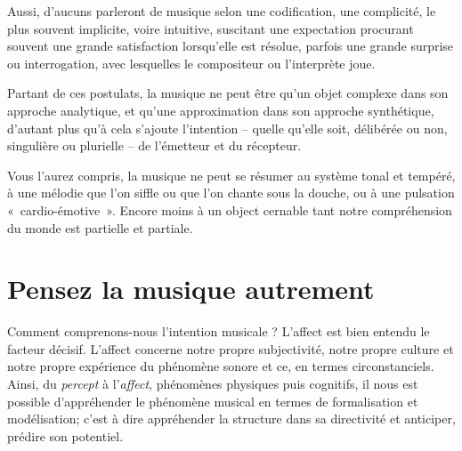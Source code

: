 \documentclass{article}
\begin{document}
Aussi, d'aucuns parleront de musique selon une codification, une complicité, le plus souvent implicite, voire intuitive, suscitant une expectation procurant souvent une grande satisfaction lorsqu'elle est résolue, parfois une grande surprise ou interrogation, avec lesquelles le compositeur ou l'interprète joue.  

\bigskip

Partant de ces postulats, la musique ne peut être qu'un objet complexe dans son approche analytique, et qu'une approximation dans son approche synthétique, d'autant plus qu'à cela s'ajoute l'intention -- quelle qu'elle soit, délibérée ou non, singulière ou plurielle -- de l'émetteur et du récepteur. 

Vous l'aurez compris, la musique ne peut se résumer au système tonal et tempéré, à une mélodie que l'on siffle ou que l'on chante sous la douche, ou à une pulsation \hbox{« cardio-}\hbox{émotive »}. Encore moins à un object cernable tant notre compréhension du monde est partielle et partiale. 

\section*{Pensez la musique autrement}

Comment comprenons-nous l’intention musicale ? L’affect est bien entendu le facteur décisif. L’affect concerne notre propre subjectivité, notre propre culture et notre propre expérience du phénomène sonore et ce, en termes circonstanciels. Ainsi, du \textit{percept} à l'\textit{affect}, phénomènes physiques puis cognitifs, il nous est possible d’appréhender le phénomène musical en termes de formalisation et modélisation; c'est à dire appréhender la structure dans sa directivité et anticiper, prédire son potentiel.  
\end{document}
